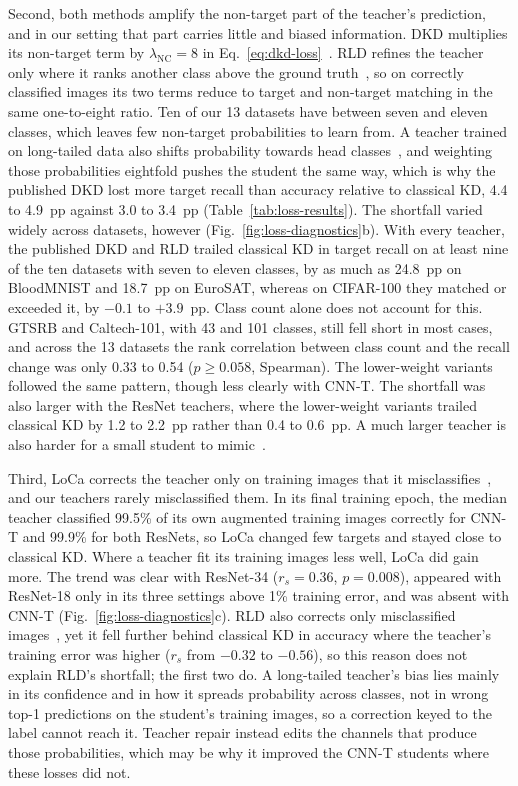 \documentclass[10pt,journal,compsoc]{IEEEtran}
\theoremstyle{definition}
\begin{document}
Second, both methods amplify the non-target part of the teacher's
prediction, and in our setting that part carries little and biased
information. DKD multiplies its non-target term by
$\lambda_{\mathrm{NC}}=8$ in Eq.~\eqref{eq:dkd-loss}~\cite{zhao2022decoupled}. RLD refines the teacher only where it
ranks another class above the ground truth~\cite{sun2025knowledge}, so
on correctly classified images its two terms reduce to target and
non-target matching in the same one-to-eight ratio. Ten of our 13
datasets have between seven and eleven classes, which leaves few
non-target probabilities to learn from. A teacher trained on
long-tailed data also shifts probability towards head
classes~\cite{huang2025learn}, and weighting those
probabilities eightfold pushes the student the same way, which is why
the published DKD lost more target recall than accuracy relative to
classical KD, 4.4 to 4.9~pp against 3.0 to 3.4~pp
(Table~\ref{tab:loss-results}). The shortfall varied widely across
datasets, however (Fig.~\ref{fig:loss-diagnostics}b). With every
teacher, the published DKD and RLD trailed classical KD in target
recall on at least nine of the ten datasets with seven to eleven
classes, by as much as 24.8~pp on BloodMNIST and 18.7~pp on EuroSAT,
whereas on CIFAR-100 they matched or exceeded it, by $-0.1$ to
$+3.9$~pp. Class count alone does not account for this. GTSRB and
Caltech-101, with 43 and 101 classes, still fell short in most cases,
and across the 13 datasets the rank correlation between class count
and the recall change was only 0.33 to 0.54 ($p\geq0.058$, Spearman).
The lower-weight variants followed the same pattern, though less clearly
with CNN-T. The shortfall was also larger with the ResNet teachers, where the
lower-weight variants trailed classical KD by 1.2 to 2.2~pp rather than
0.4 to 0.6~pp. A much larger teacher is also harder for a small
student to mimic~\cite{cho2019efficacy}.

Third, LoCa corrects the teacher only on training images that it
misclassifies~\cite{yang2024loca}, and our teachers rarely
misclassified them. In its final training epoch, the median teacher
classified 99.5\% of its own augmented training images correctly for
CNN-T and 99.9\% for both ResNets, so LoCa changed few targets and
stayed close to classical KD. Where a teacher fit its training images
less well, LoCa did gain more. The trend was clear with ResNet-34
($r_s=0.36$, $p=0.008$), appeared with ResNet-18 only in its three
settings above 1\% training error, and was absent with CNN-T
(Fig.~\ref{fig:loss-diagnostics}c). RLD also corrects only misclassified
images~\cite{sun2025knowledge}, yet it fell further behind classical KD
in accuracy where the teacher's training error was higher ($r_s$ from
$-0.32$ to $-0.56$), so this reason does not explain RLD's shortfall;
the first two do. A long-tailed teacher's bias
lies mainly in its confidence and in how it spreads probability across
classes, not in wrong top-1 predictions on the student's training
images, so a correction keyed to the label cannot reach it. Teacher repair instead edits the channels that produce those
probabilities, which may be why it improved the CNN-T students where
these losses did not.
\end{document}
